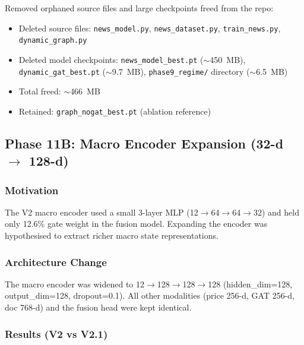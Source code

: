 \documentclass[12pt,a4paper]{article}
\begin{document}
Removed orphaned source files and large checkpoints freed from the repo:

\begin{itemize}
    \item Deleted source files: \texttt{news\_model.py}, \texttt{news\_dataset.py},
          \texttt{train\_news.py}, \texttt{dynamic\_graph.py}
    \item Deleted model checkpoints: \texttt{news\_model\_best.pt} ($\sim$450~MB),
          \texttt{dynamic\_gat\_best.pt} ($\sim$9.7~MB),
          \texttt{phase9\_regime/} directory ($\sim$6.5~MB)
    \item Total freed: $\sim$466~MB
    \item Retained: \texttt{graph\_nogat\_best.pt} (ablation reference)
\end{itemize}

\subsection{Phase 11B: Macro Encoder Expansion (32-d $\to$ 128-d)}

\subsubsection{Motivation}
The V2 macro encoder used a small 3-layer MLP
(12$\to$64$\to$64$\to$32) and held only 12.6\% gate weight in the
fusion model. Expanding the encoder was hypothesised to extract richer
macro state representations.

\subsubsection{Architecture Change}
The macro encoder was widened to
12$\to$128$\to$128$\to$128 (hidden\_dim=128, output\_dim=128, dropout=0.1).
All other modalities (price 256-d, GAT 256-d, doc 768-d) and the fusion
head were kept identical.

\subsubsection{Results (V2 vs V2.1)}
\end{document}
